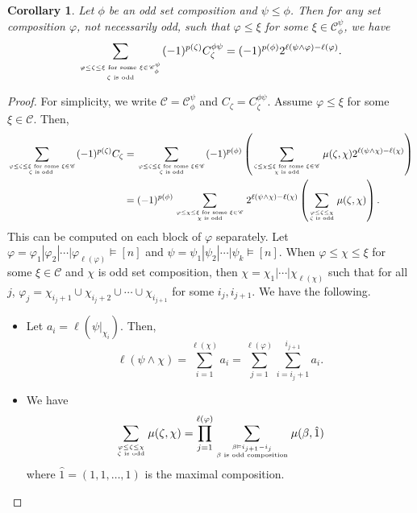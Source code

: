 \documentclass[11pt]{amsart}
\newtheorem{Corollary}[Theorem]{Corollary}
\numberwithin{equation}{section}
\begin{document}
\begin{Corollary}\label{lem:int2}
	Let $\phi$ be an odd set composition and $\psi\leq\phi$. Then for any set composition $\varphi$, not necessarily odd, such that $\varphi\leq\xi$ for some $\xi\in\mathscr{C}_\phi^\psi$, we have
	$$\sum_{\varphi\leq\zeta\leq\xi\text{ for some }\xi\in\mathscr{C}_\phi^\psi \atop \zeta\text{ is odd}}(-1)^{p(\zeta)}C_\zeta^{\phi\psi}=(-1)^{p(\phi)}2^{\ell(\psi\land\varphi)-\ell(\varphi)}.$$
\end{Corollary}

\begin{proof}
	For simplicity, we write $\mathscr{C}=\mathscr{C}_\phi^{\psi}$ and $C_\zeta=C_\zeta^{\phi\psi}$. Assume $\varphi\leq \xi$ for some $\xi\in\mathscr{C}$. Then,
	\begin{align*}
		\sum_{\varphi\leq\zeta\leq\xi\text{ for some }\xi\in\mathscr{C} \atop \zeta\text{ is odd }}(-1)^{p(\zeta)}C_\zeta&=\sum_{\varphi\leq\zeta\leq\xi\text{ for some }\xi\in\mathscr{C} \atop \zeta\text{ is odd}}(-1)^{p(\phi)}\left(\sum_{\zeta\leq\chi\leq\xi\text{ for some }\xi\in\mathscr{C} \atop \chi\text{ is odd}}\mu(\zeta,\chi)2^{\ell(\psi\land\chi)-\ell(\chi)}\right)\\
		&=(-1)^{p(\phi)}\sum_{\varphi\leq\chi\leq\xi\text{ for some }\xi\in\mathscr{C} \atop \chi\text{ is odd}}2^{\ell(\psi\land\chi)-\ell(\chi)}\left(\sum_{\varphi\leq\zeta\leq\chi \atop \zeta\text{ is odd}}\mu(\zeta,\chi)\right).
	\end{align*}
	This can be computed on each block of $\varphi$ separately. Let $\varphi=\varphi_1|\varphi_2|\cdots|\varphi_{\ell(\varphi)}\vDash[n]$ and $\psi=\psi_1|\psi_2|\cdots|\psi_k\vDash [n]$. When $\varphi\leq\chi\leq\xi$ for some $\xi\in\mathscr{C}$ and $\chi$ is odd set composition, then $\chi=\chi_1|\cdots|\chi_{\ell(\chi)}$ such that for all $j$, $\varphi_j=\chi_{i_j+1}\cup \chi_{i_j+2}\cup\cdots\cup \chi_{i_{j+1}}$ for some $i_j,i_{j+1}$.  We have the following.
		\begin{itemize}
		\item Let $a_i=\ell(\psi|_{\chi_i})$. Then, $$\displaystyle\ell(\psi\land\chi)=\sum_{i=1}^{\ell(\chi)} a_i=\sum_{j=1}^{\ell(\varphi)}\sum_{i=i_j+1}^{i_{j+1}}a_i.$$
		\item We have $$\displaystyle\sum_{\varphi\leq\zeta\leq\chi \atop \zeta\text{ is odd}}\mu(\zeta,\chi)=\prod_{j=1}^{\ell(\varphi)}\sum_{\beta\vDash i_{j+1}-i_j \atop \beta\text{ is odd composition}}\mu(\beta,\hat{1})$$ where $\hat{1}=(1,1,\dots,1)$ is the maximal composition.
	\end{itemize}
	

\end{proof}
\end{document}

